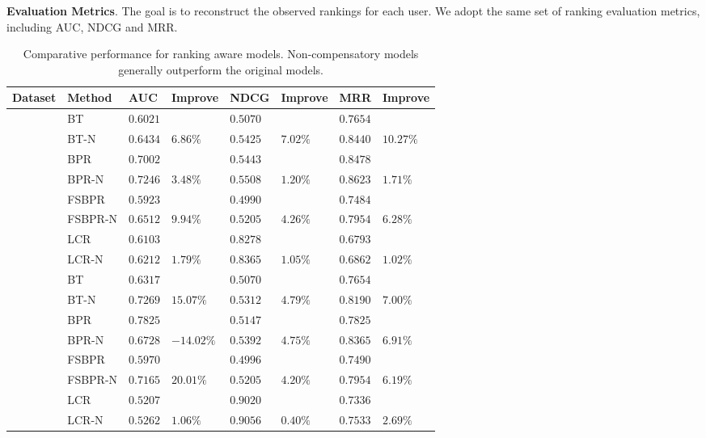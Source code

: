 \documentclass[letterpaper]{article} %
\begin{document}
\textbf{Evaluation Metrics}.  The goal is to reconstruct the observed rankings for each user. We adopt the same set of ranking evaluation metrics, including AUC, NDCG and MRR. 
\begin{table}[htp]
\tiny
\caption{Comparative performance for ranking aware models.  Non-compensatory models generally outperform the original models.}%
\begin{center}
\begin{tabular}{p{0.4cm}<{\centering}|p{1.4cm}<{\centering} |p{0.5cm} p{0.6cm} |p{0.5cm} p{0.6cm} |p{0.5cm} p{0.6cm}}
\hline
Dataset	& Method	& AUC	& Improve&	NDCG&	Improve&	MRR	&Improve\\\hline
{} &	BT	& $0.6021$ 	& &	$0.5070$ 	&&	$0.7654$ 	&\\
	&BT-N	&$0.6434$ &	$6.86\%$	&$0.5425 $	&$7.02\%$	&$0.8440$ &	$10.27\%$	\\
	&BPR&	$0.7002$ 	&&	$0.5443$ 	&&	$0.8478$ &\\
	&BPR-N	&$0.7246$ 	&$3.48\%$	&$0.5508$ &	$1.20\%$	&$0.8623$ 	&$1.71\%$	\\
	&FSBPR		&$0.5923$&	&$0.4990$ 	&&	$0.7484$&\\	
	&FSBPR-N	&$0.6512$	&$9.94\%$	&	$0.5205$ 	&$4.26\%$	&$0.7954$ 	&$6.28\%$	\\
	&LCR		&$0.6103$&	&$0.8278$ 	&&	$0.6793$&\\	
	&LCR-N	&$0.6212$	&$1.79\%$	&	$0.8365$ 	&$1.05\%$	&$0.6862$ 	&$1.02\%$ \\

	\hline
{}	&	BT	& $0.6317 $ 	& &	$0.5070$ 	&&	$0.7654$ 	&\\
	&BT-N	&$0.7269$ &	$15.07\%$	&$0.5312 $	&$4.79\%$	&$0.8190$ &	$7.00\%$	\\
	&BPR&	$0.7825$ 	&&	$0.5147$ 	&&	$0.7825$ &\\
	&BPR-N	&$0.6728$ 	&$-14.02\%$	&$0.5392$ &	$4.75\%$	&$0.8365$ 	&$6.91\%$	\\
	&FSBPR		&$0.5970$&	&$0.4996$ 	&&	$0.7490$&\\	
	&FSBPR-N	&$0.7165$	&$20.01\%$	&	$0.5205$ 	&$4.20\%$	&$0.7954$ 	&$6.19\%$	\\
	&LCR		&$0.5207$&	&$0.9020$ 	&&	$0.7336$&\\	
	&LCR-N	&$0.5262$	&$1.06\%$	&	$0.9056$ 	&$0.40\%$	&$0.7533$ 	&$2.69\%$ \\


\end{tabular}
\end{center}
\end{table}
\end{document}
